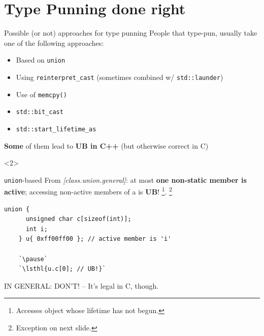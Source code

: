 \section{Type Punning done right}

\begin{frame}{Possible (or not) approaches for type punning}
  People that type-pun, usually take one of the following approaches:
  \vfill

  \begin{itemize}
  \item Based on \texttt{union}
  \item Using \texttt{reinterpret\_cast} (sometimes combined w/ \texttt{std::launder})
  \item Use of \texttt{memcpy()}
  \item \texttt{std::bit\_cast}
  \item \texttt{std::start\_lifetime\_as}
  \end{itemize}

  \vfill
  \textbf{Some} of them lead to \textbf{UB in C++} (but otherwise correct in C)

  \begin{onlyenv}<2>
  \end{onlyenv}
\end{frame}

\begin{frame}[fragile]{\texttt{union}-based}
  From \textit{[class.union.general]}: at most \textbf{one non-static member is active}; accessing non-active members of a  is \textbf{UB}!%
  \footnote{Accesses object whose lifetime has not begun.}.
  \footnote{Exception on next slide.}

  \begin{lstlisting}[style=c++]
    union {
      unsigned char c[sizeof(int)];
      int i;
    } u{ 0xff00ff00 }; // active member is 'i'

    `\pause`
    `\lsthl{u.c[0]; // UB!}`
  \end{lstlisting}

  \vfill
  \alert{IN GENERAL: DON'T!} -- It's legal in C, though.
\end{frame}

